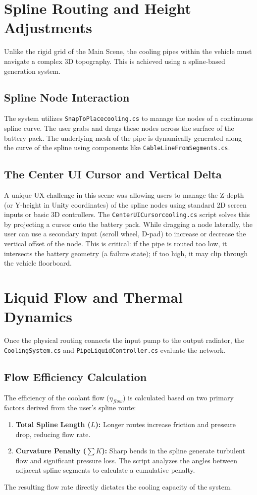 \documentclass[12pt,a4paper,oneside]{report}
\begin{document}
\section{Spline Routing and Height Adjustments}
Unlike the rigid grid of the Main Scene, the cooling pipes within the vehicle must navigate a complex 3D topography. This is achieved using a spline-based generation system.

\subsection{Spline Node Interaction}
The system utilizes \texttt{SnapToPlacecooling.cs} to manage the nodes of a continuous spline curve. The user grabs and drags these nodes across the surface of the battery pack. The underlying mesh of the pipe is dynamically generated along the curve of the spline using components like \texttt{CableLineFromSegments.cs}.

\subsection{The Center UI Cursor and Vertical Delta}
A unique UX challenge in this scene was allowing users to manage the Z-depth (or Y-height in Unity coordinates) of the spline nodes using standard 2D screen inputs or basic 3D controllers. The \texttt{CenterUICursorcooling.cs} script solves this by projecting a cursor onto the battery pack. 
While dragging a node laterally, the user can use a secondary input (scroll wheel, D-pad) to increase or decrease the vertical offset of the node. This is critical: if the pipe is routed too low, it intersects the battery geometry (a failure state); if too high, it may clip through the vehicle floorboard.

\section{Liquid Flow and Thermal Dynamics}
Once the physical routing connects the input pump to the output radiator, the \texttt{CoolingSystem.cs} and \texttt{PipeLiquidController.cs} evaluate the network.

\subsection{Flow Efficiency Calculation}
The efficiency of the coolant flow ($\eta_{flow}$) is calculated based on two primary factors derived from the user's spline route:
\begin{enumerate}
    \item \textbf{Total Spline Length ($L$):} Longer routes increase friction and pressure drop, reducing flow rate.
    \item \textbf{Curvature Penalty ($\sum K$):} Sharp bends in the spline generate turbulent flow and significant pressure loss. The script analyzes the angles between adjacent spline segments to calculate a cumulative penalty.
\end{enumerate}
The resulting flow rate directly dictates the cooling capacity of the system.
\end{document}
